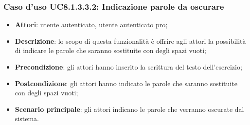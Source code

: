 \subsubsection{Caso d'uso UC8.1.3.3.2: Indicazione parole da oscurare}
	\begin{itemize}
		\item
			\textbf{Attori}: utente autenticato, utente autenticato pro;
		\item		
			\textbf{Descrizione}: lo scopo di questa funzionalità è offrire agli attori la possibilità di indicare le parole che saranno sostituite con degli spazi vuoti;
		\item
			\textbf{Precondizione}: gli attori hanno inserito la scrittura del testo dell'esercizio; 
		\item
			\textbf{Postcondizione}: gli attori hanno indicato le parole che saranno sostituite con degli spazi vuoti;
		\item
			\textbf{Scenario principale}: gli attori indicano le parole che verranno oscurate dal sistema.
	\end{itemize}